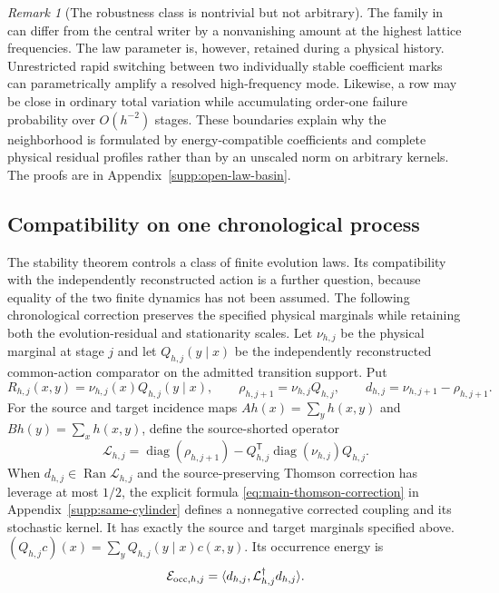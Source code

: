 \documentclass[11pt]{article}
\numberwithin{equation}{section}
\theoremstyle{definition}
\theoremstyle{remark}
\newtheorem{remark}[remark]{Remark}
\newcommand{\Ran}{\operatorname{Ran}}
\newcommand{\diag}{\operatorname{diag}}
\begin{document}
\begin{remark}[The robustness class is nontrivial but not arbitrary]
\label{rem:main-law-basin-scope}
The family in  can differ from the central
writer by a nonvanishing amount at the highest lattice frequencies.  The law
parameter is, however, retained during a physical history.  Unrestricted
rapid switching between two individually stable coefficient marks can
parametrically amplify a resolved high-frequency mode.  Likewise, a row may
be close in ordinary total variation while accumulating order-one failure
probability over $O(h^{-2})$ stages.  These boundaries explain why the
neighborhood is formulated by energy-compatible coefficients and complete
physical residual profiles rather than by an unscaled norm on arbitrary
kernels.  The proofs are in Appendix~\ref{supp:open-law-basin}.
\end{remark}


\subsection{Compatibility on one chronological process}
\label{subsec:main-same-cylinder}

The stability theorem controls a class of finite evolution laws. Its
compatibility with the independently reconstructed action is a further
question, because equality of the two finite dynamics has not been assumed.
The following chronological correction preserves the specified physical
marginals while retaining both the evolution-residual and stationarity scales.  Let $\nu_{h,j}$ be the physical marginal at
stage $j$ and let $Q_{h,j}(y\mid x)$ be the independently reconstructed
common-action comparator on the admitted transition support.  Put
\begin{equation}
 R_{h,j}(x,y)=\nu_{h,j}(x)Q_{h,j}(y\mid x),\qquad
 \rho_{h,j+1}=\nu_{h,j}Q_{h,j},\qquad
 d_{h,j}=\nu_{h,j+1}-\rho_{h,j+1}.
 \label{eq:main-same-cylinder-reference}
\end{equation}
For the source and target incidence maps
$Ah(x)=\sum_yh(x,y)$ and $Bh(y)=\sum_xh(x,y)$, define the source-shorted
operator
\begin{equation}
 \mathcal L_{h,j}
 =\diag(\rho_{h,j+1})
  -Q_{h,j}^{\mathsf T}\diag(\nu_{h,j})Q_{h,j}.
 \label{eq:main-thomson-operator}
\end{equation}
When $d_{h,j}\in\Ran\mathcal L_{h,j}$ and the source-preserving
Thomson correction has leverage at most $1/2$, the explicit formula
\eqref{eq:main-thomson-correction} in Appendix~\ref{supp:same-cylinder}
defines a nonnegative corrected coupling and its stochastic kernel.
It has exactly the source and target marginals specified above.
$(Q_{h,j}c)(x)=\sum_yQ_{h,j}(y\mid x)c(x,y)$.  Its occurrence energy is
\begin{equation}
 \mathcal E_{{\rm occ},h,j}
 =\langle d_{h,j},\mathcal L_{h,j}^{\dagger}d_{h,j}\rangle.
 \label{eq:main-occurrence-energy}
\end{equation}
\end{document}
